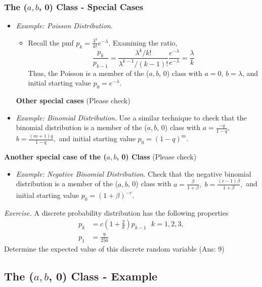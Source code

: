 \documentclass[]{book}
\providecommand{\tightlist}{%
  \setlength{\itemsep}{0pt}\setlength{\parskip}{0pt}}
\begin{document}
\subsubsection{\texorpdfstring{The (\(a, b\), 0) Class - Special
Cases}{The (a, b, 0) Class - Special Cases}}\label{the-a-b-0-class---special-cases}

\begin{itemize}
\item
  \emph{Example: Poisson Distribution}.

  \begin{itemize}
  \tightlist
  \item
    Recall the pmf \(p_k =\frac{\lambda^k}{k!}e^{-\lambda}\). Examining
    the ratio,
    \[\frac{p_k}{p_{k-1}} = \frac{\lambda^k/k!}{\lambda^{k-1}/(k-1)!}\frac{e^{-\lambda}}{e^{-\lambda}}= \frac{\lambda}{k}\]
    Thus, the Poisson is a member of the (\(a, b\), 0) class with
    \(a = 0\), \(b = \lambda\), and initial starting value
    \(p_0 = e^{-\lambda}\).
  \end{itemize}

  \textbf{Other special cases} (Please check)
\item
  \emph{Example: Binomial Distribution}. Use a similar technique to
  check that the binomial distribution is a member of the (\(a, b\), 0)
  class with \(a = \frac{-q}{1-q},\) \(b = \frac{(m+1)q}{1-q},\) and
  initial starting value \(p_0 = (1-q)^m\).
\end{itemize}

\textbf{Another special case of the (\(a, b\), 0) Class} (Please check)

\begin{itemize}
\tightlist
\item
  \emph{Example: Negative Binomial Distribution}. Check that the
  negative binomial distribution is a member of the (\(a, b\), 0) class
  with \(a = \frac{\beta}{1+\beta},\)
  \(b = \frac{(r-1)\beta}{1+\beta},\) and initial starting value
  \(p_0 = (1+\beta)^{-r}\).
\end{itemize}

\emph{Exercise.} A discrete probability distribution has the following
properties \[\begin{aligned}
p_k&=c\left( 1+\frac{2}{k}\right) p_{k-1} \:\:\: k=1,2,3,\\
p_1&= \frac{9}{256}\end{aligned}\] Determine the expected value of this
discrete random variable (Ans: 9)

\subsection{\texorpdfstring{The (\(a, b\), 0) Class -
Example}{The (a, b, 0) Class - Example}}\label{the-a-b-0-class---example}
\end{document}
